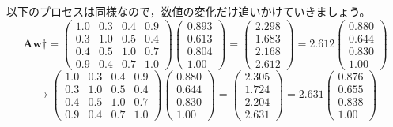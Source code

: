 \documentclass{ltjsbook}
\begin{document}
以下のプロセスは同様なので，数値の変化だけ追いかけていきましょう。
$$\bm{A}\bm{w}\dagger=\left( \begin{array}{cccc} 1.0 & 0.3 & 0.4 & 0.9\\ 0.3 & 1.0 & 0.5 & 0.4\\  0.4 & 0.5 & 1.0 & 0.7\\ 0.9 & 0.4 & 0.7 & 1.0 \end{array} \right) \left( \begin{array}{c} 0.893\\ 0.613\\ 0.804\\ 1.00 \end{array} \right)=\left( \begin{array}{c} 2.298\\ 1.683\\ 2.168\\ 2.612 \end{array} \right)=2.612\left( \begin{array}{c} 0.880\\ 0.644\\ 0.830\\ 1.00 \end{array} \right)$$
$$\to\left( \begin{array}{cccc} 1.0 & 0.3 & 0.4 & 0.9\\ 0.3 & 1.0 & 0.5 & 0.4\\  0.4 & 0.5 & 1.0 & 0.7\\ 0.9 & 0.4 & 0.7 & 1.0 \end{array} \right) \left( \begin{array}{c} 0.880\\ 0.644\\ 0.830\\ 1.00 \end{array} \right)=\left( \begin{array}{c} 2.305\\ 1.724\\ 2.204\\ 2.631 \end{array} \right)=2.631\left( \begin{array}{c} 0.876\\ 0.655\\ 0.838\\ 1.00 \end{array} \right)$$
\end{document}
